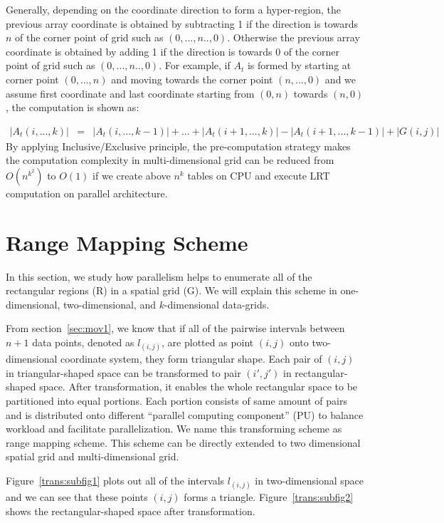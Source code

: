 \documentclass[AMA,LATO1COL]{WileyNJD-v2}
\begin{document}
\normalsize
Generally, depending on the coordinate direction to form a hyper-region, the previous array coordinate is obtained by subtracting 1 if the direction is towards $n$ of the corner point of grid such as $(0,...,n..,0)$. Otherwise the previous array coordinate is obtained by adding 1 if the direction is towards $0$ of the corner point of grid such as  $(0,...,n..,0)$. For example, if $A_t$ is formed by starting at corner point $(0,...,n)$ and moving towards the corner point $(n,...,0)$ and we assume first coordinate and last coordinate starting from $(0,n)$ towards $(n,0)$, the computation is shown as: 

\begin{eqnarray}
|A_t(i,...,k)|  &= & |A_t(i,...,k-1)| + ...+ |A_t(i+1,...,k)|  - |A_t(i+1,...,k-1)| + |G(i,j)|
\end{eqnarray}
\normalsize
By applying Inclusive/Exclusive principle, the pre-computation strategy makes the computation complexity in multi-dimensional grid can be reduced from $O(n^{k^2})$ to $O(1)$ if we create above $n^k$ tables on CPU and execute LRT computation on parallel architecture.

\section {Range Mapping Scheme} \label{RMS}
In this section, we study how parallelism helps to enumerate all of the rectangular regions (R) in a spatial grid (G). We will explain this scheme in one-dimensional, two-dimensional, and $k$-dimensional data-grids.

From section~\ref{sec:mov1}, we know that if all of the pairwise intervals between $n+1$ data points, denoted as $l_{(i,j)}$, are plotted as point $(i,j)$ onto two-dimensional coordinate system, they form triangular shape. Each pair of $(i,j)$ in triangular-shaped space can be transformed to pair $(i',j')$ in rectangular-shaped space. After transformation, it enables the whole rectangular space to be partitioned into equal portions. Each portion consists of same amount of pairs and is distributed onto different ``parallel computing component'' (PU) to balance workload and facilitate parallelization. We name this transforming scheme as range mapping scheme. This scheme can be directly extended to two dimensional spatial grid and multi-dimensional grid.

Figure~\ref{trans:subfig1} plots out all of the intervals $l_{(i,j)}$ in two-dimensional space and we can see that these points $(i,j)$ forms a triangle. Figure~\ref{trans:subfig2} shows the rectangular-shaped space after transformation.
\end{document}
